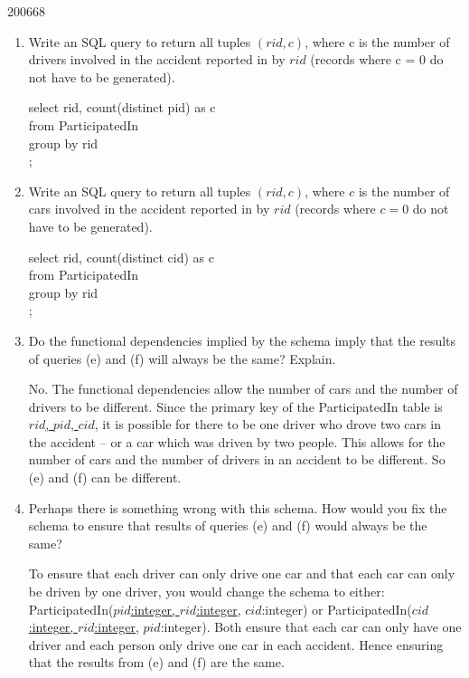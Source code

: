 \documentclass[10pt,\jkfside,a4paper]{article}
\begin{document}
\begin{examquestion}{2006}{6}{8}
\begin{enumerate}
{\ttfamily
select ar.pid, ar.rid\\
from AccidentReport as ar\\
join OwnedBy as ob on ob.cid = ar.cid\\
where ob.pid != ar.pid\\
;
}


\item{Write an SQL query to return all tuples $(rid, c)$, where c is the number of
drivers involved in the accident reported in by $rid$ (records where c = 0 do not
have to be generated).}

{\ttfamily
select rid, count(distinct pid) as c\\
from ParticipatedIn\\
group by rid\\
;
}

\item{Write an SQL query to return all tuples $(rid, c)$, where $c$ is the number of cars
involved in the accident reported in by $rid$ (records where $c = 0$ do not have
to be generated).}

{\ttfamily
select rid, count(distinct cid) as c\\
from ParticipatedIn\\
group by rid\\
;
}

\item{Do the functional dependencies implied by the schema imply that the results
of queries (e) and (f) will always be the same? Explain.}

No. The functional dependencies allow the number of cars and the number of drivers to be different.
Since the primary key of the ParticipatedIn table is \underline{$rid$, $pid$, $cid$}, 
it is possible for there to be one driver who drove two cars in the accident -- or a car which was driven by two people. 
This allows for the number of cars and the number of drivers in an accident to be different. So (e) and (f) can be different.

\item{Perhaps there is something wrong with this schema. How would you fix the
schema to ensure that results of queries (e) and (f) would always be the same?}

To ensure that each driver can only drive one car and that each car can only be driven by one driver, 
you would change the schema to either: ParticipatedIn(\underline {$pid$:integer, $rid$:integer}, $cid$:integer) 
or ParticipatedIn(\underline{$cid$:integer, $rid$:integer}, $pid$:integer). 
Both ensure that each car can only have one driver and each person only drive one car in each accident. 
Hence ensuring that the results from (e) and (f) are the same.
\end{enumerate}
\end{examquestion}
\end{document}
